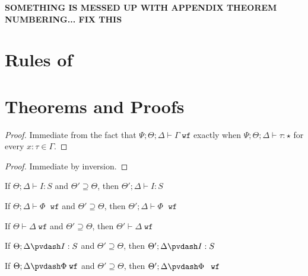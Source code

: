 \textbf{SOMETHING IS MESSED UP WITH APPENDIX THEOREM NUMBERING... FIX THIS}
\section{Rules of \dlambdaamor}

\section{\dlambdaamor Theorems and Proofs}

\ctxwfstreng*
\begin{proof}
Immediate from the fact that $\Psi ; \Theta ; \Delta \vdash \Gamma \; \texttt{wf}$ exactly when $\Psi ; \Theta ; \Delta \vdash \tau : \star$ for every $x : \tau \in \Gamma$.
\end{proof}

\conwfstreng*
\begin{proof}
Immediate by inversion.
\end{proof}

\begin{theorem}
If $\Theta ; \Delta \vdash I : S$ and $\Theta' \supseteq \Theta$, then $\Theta' ; \Delta \vdash I : S$
\end{theorem}

\begin{theorem}
If $\Theta ; \Delta \vdash \Phi \; \texttt{ wf}$ and $\Theta' \supseteq \Theta$, then $\Theta' ; \Delta \vdash \Phi \; \texttt{ wf}$
\end{theorem}

\begin{theorem}
If $\Theta \vdash \Delta \; \texttt{wf}$ and $\Theta' \supseteq \Theta$, then $\Theta' \vdash \Delta \; \texttt{wf}$
\end{theorem}

\begin{theorem}
If $\Theta ; \Delta \pvdash I : S$ and $\Theta' \supseteq \Theta$, then $\Theta' ; \Delta \pvdash I : S$
\end{theorem}

\begin{theorem}
If $\Theta ; \Delta \pvdash \Phi \; \texttt{wf}$ and $\Theta' \supseteq \Theta$, then $\Theta' ; \Delta \pvdash \Phi \; \texttt{ wf}$
\end{theorem}

